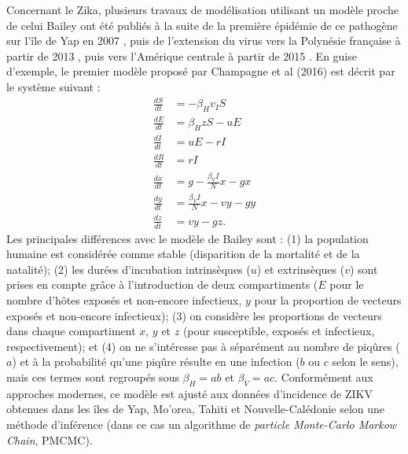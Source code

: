 Concernant le Zika, plusieurs travaux de modélisation utilisant un modèle proche de celui Bailey ont été publiés à la suite de la première épidémie de ce pathogène sur l'île de Yap en 2007 \cite{funk2016comparative}, puis de l'extension du virus vers la Polynésie française à partir de 2013 \cite{kucharski_transmission_2016,Champagne064949}, puis vers l'Amérique centrale à partir de 2015 \cite{zhang_spread_2017,alex_perkins_model-based_2016,gao2016prevention}.
En guise d'exemple, le premier modèle proposé par Champagne et al (2016) est décrit par le système suivant \cite{Champagne064949} :
\begin{align}
\frac{dS}{dt} &= -\beta_Hv_IS \\ \nonumber
\frac{dE}{dt} &= \beta_HzS - uE \\ \nonumber
\frac{dI}{dt} &= uE - rI \\ \nonumber
\frac{dR}{dt} &= rI \\  \nonumber
\frac{dx}{dt} &= g - \frac{\beta_VI}{N}x - gx \\ \nonumber
\frac{dy}{dt} &= \frac{\beta_VI}{N}x - v y - gy \\ \nonumber
\frac{dz}{dt} &= v y - gz.
\end{align}
Les principales différences avec le modèle de Bailey sont : (1) la population humaine est considérée comme stable (disparition de la mortalité et de la natalité); (2) les durées d'incubation intrinsèques ($u$) et extrinsèques ($v$) sont prises en compte grâce à l'introduction de deux compartiments ($E$ pour le nombre d'hôtes exposés et non-encore infectieux, $y$ pour la proportion de vecteurs exposés et non-encore infectieux); (3) on considère les proportions de vecteurs dans chaque compartiment $x$, $y$ et $z$ (pour susceptible, exposés et infectieux, respectivement); et (4) on ne s'intéresse pas à séparément au nombre de piqûres ($a$) et à la probabilité qu'une piqûre résulte en une infection ($b$ ou $c$ selon le sens), mais ces termes sont regroupés sous $\beta_H = ab$ et $\beta_V = ac$.
Conformément aux approches modernes, ce modèle est ajusté aux données d'incidence de ZIKV obtenues dans les îles de Yap, Mo'orea, Tahiti et Nouvelle-Calédonie selon une méthode d'inférence (dans ce cas un algorithme de {\em particle Monte-Carlo Markow Chain}, PMCMC).

%
%
%
%
%




